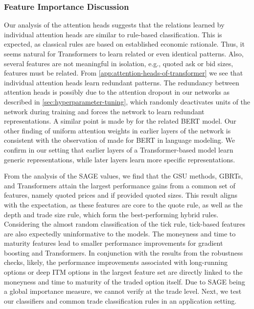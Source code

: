 \subsubsection{Feature Importance Discussion}\label{sec:feature-importance-discussion}

Our analysis of the attention heads suggests that the relations learned by individual attention heads are similar to rule-based classification. This is expected, as classical rules are based on established economic rationale. Thus, it seems natural for Transformers to learn related or even identical patterns. Also, several features are not meaningful in isolation, e.g., quoted ask or bid sizes, features must be related. From \cref{app:attention-heads-of-transformer} we see that individual attention heads learn redundant patterns. The redundancy between attention heads is possibly due to the attention dropout in our networks as described in \cref{sec:hyperparameter-tuning}, which randomly deactivates units of the network during training and forces the network to learn redundant representations. A similar point is made by \textcite[][283--284]{clarkWhatDoesBERT2019} for the related \gls{BERT} model. Our other finding of uniform attention weights in earlier layers of the network is consistent with the observation of \textcite[][4193]{abnarQuantifyingAttentionFlow2020} made for \gls{BERT} in language modeling. We confirm in our setting that earlier layers of a Transformer-based model learn generic representations, while later layers learn more specific representations.

From the analysis of the \gls{SAGE} values, we find that the \gls{GSU} methods, \glspl{GBRT}, and Transformers attain the largest performance gains from a common set of features, namely quoted prices and if provided quoted sizes. This result aligns with the expectation, as these features are core to the quote rule, as well as the depth and trade size rule, which form the best-performing hybrid rules. Considering the almost random classification of the tick rule, tick-based features are also expectedly uninformative to the models. The moneyness and time to maturity features lead to smaller performance improvements for gradient boosting and Transformers. In conjunction with the results from the robustness checks, likely, the performance improvements associated with long-running options or deep \gls{ITM} options in the largest feature set are directly linked to the moneyness and time to maturity of the traded option itself. Due to \gls{SAGE} being a global importance measure, we cannot verify at the trade level. Next, we test our classifiers and common trade classification rules in an application setting.

